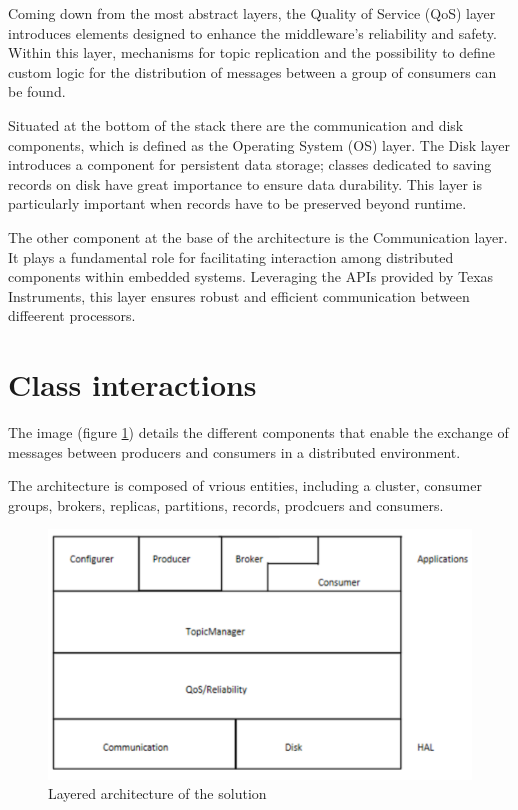 Coming down from the most abstract layers, the Quality of Service (QoS) layer
introduces elements designed to enhance the middleware's reliability and
safety. Within this layer, mechanisms for topic replication and the possibility
to define custom logic for the distribution of messages between a group of
consumers can be found.

Situated at the bottom of the stack there are the communication and disk
components, which is defined as the Operating System (OS) layer.
The Disk layer introduces a component for persistent data storage; classes
dedicated to saving records on disk have great importance to ensure data
durability.
This layer is particularly important when records have to be preserved beyond
runtime.

The other component at the base of the architecture is the Communication layer.
It plays a fundamental role for facilitating interaction among distributed
components within embedded systems.
Leveraging the APIs provided by Texas Instruments, this layer ensures robust
and efficient communication between diffeerent processors.

\section{Class interactions}

The image (figure \ref{fig:class_diagram}) details the different components
that enable the exchange of messages between producers and consumers in a
distributed environment.

The architecture is composed of vrious entities, including a cluster,
consumer groups, brokers, replicas, partitions, records, prodcuers and
consumers. 

\begin{figure}[H]
    \centering
    \includegraphics[width=1.0\textwidth]{Figures/architecture_layers.png}
    \caption{Layered architecture of the solution}
    \label{fig:class_diagram}
\end{figure}

